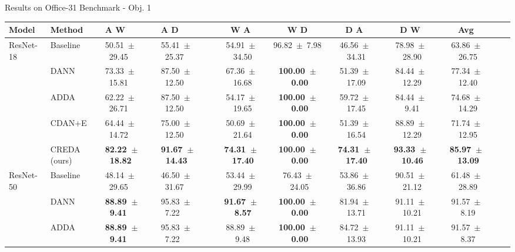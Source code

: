 \documentclass[aspectratio=169]{beamer}
\begin{document}
\begin{frame}{Results on Office-31 Benchmark - Obj. 1}
\begin{table}[H]
\tiny

\begin{tabularx}{\linewidth}{p{0.6cm}p{1.35cm}p{1.35cm}lccccccc}

\toprule
\textbf{Model} & \textbf{Method} & \textbf{A \boldmath{$\rightarrow$} W} & \textbf{A \boldmath{$\rightarrow$} D} & \textbf{W \boldmath{$\rightarrow$} A} & \textbf{W \boldmath{$\rightarrow$} D} & \textbf{D \boldmath{$\rightarrow$} A} & \textbf{D \boldmath{$\rightarrow$} W} & \textbf{Avg} \\
\midrule
\multirow{5}{*}{ResNet-18} & Baseline & 50.51~$\pm$~29.45 & 55.41~$\pm$~25.37 & 54.91~$\pm$~34.50 & 96.82~$\pm$~7.98 & 46.56~$\pm$~34.31 & 78.98~$\pm$~28.90 & 63.86~$\pm$~26.75 \\
 & DANN & 73.33~$\pm$~15.81 & 87.50~$\pm$~12.50 & 67.36~$\pm$~16.68 & \textbf{100.00~$\pm$~0.00 %
} & 51.39~$\pm$~17.09 & 84.44~$\pm$~12.29 & 77.34~$\pm$~12.40 \\
 & ADDA & 62.22~$\pm$~26.71 & 87.50~$\pm$~12.50 & 54.17~$\pm$~19.65 & \textbf{100.00~$\pm$~0.00} & 59.72~$\pm$~17.45 & 84.44~$\pm$~9.41 & 74.68~$\pm$~14.29 \\
 & CDAN+E & 64.44~$\pm$~14.72 & 75.00~$\pm$~12.50 & 50.69~$\pm$~21.64 & \textbf{100.00~$\pm$~0.00} & 51.39~$\pm$~16.54 & 88.89~$\pm$~12.29 & 71.74~$\pm$~12.95 \\
 & CREDA (ours) & \textbf{82.22~$\pm$~18.82} & \textbf{91.67~$\pm$~14.43} & \textbf{74.31~$\pm$~17.40} & \textbf{100.00~$\pm$~0.00} & \textbf{74.31~$\pm$~17.40} & \textbf{93.33~$\pm$~10.46} & \textbf{85.97~$\pm$~13.09} \\
\midrule
\multirow{5}{*}{ResNet-50} & Baseline & 48.14~$\pm$~29.65 & 46.50~$\pm$~31.67 & 53.44~$\pm$~29.99 & 76.43~$\pm$~24.05 & 53.86~$\pm$~36.86 & 90.51~$\pm$~21.12 & 61.48~$\pm$~28.89 \\
 & DANN & \textbf{88.89~$\pm$~9.41} & 95.83~$\pm$~7.22 & \textbf{91.67~$\pm$~8.57} & \textbf{100.00~$\pm$~0.00} & 81.94~$\pm$~13.71 & 91.11~$\pm$~10.21 & 91.57~$\pm$~8.19 \\
 & ADDA & \textbf{88.89~$\pm$~9.41} & 95.83~$\pm$~7.22 & 88.89~$\pm$~9.48 & \textbf{100.00~$\pm$~0.00} & 84.72~$\pm$~13.93 & 91.11~$\pm$~10.21 & 91.57~$\pm$~8.37 \\

\end{tabularx}
\end{table}
\end{frame}
\end{document}
